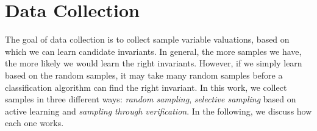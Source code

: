 
\section{Data Collection} %
\label{sec:sampling}

The goal of data collection is to collect sample variable valuations, based on which we can learn candidate invariants. In general, the more samples we have, the more likely we would learn the right invariants. However, if we simply learn based on the random samples, it may take many random samples before a classification algorithm can find the right invariant. In this work, we collect samples in three different ways: \emph{random sampling}, \emph{selective sampling} based on active learning and \emph{sampling through verification}. In the following, we discuss how each one works.


